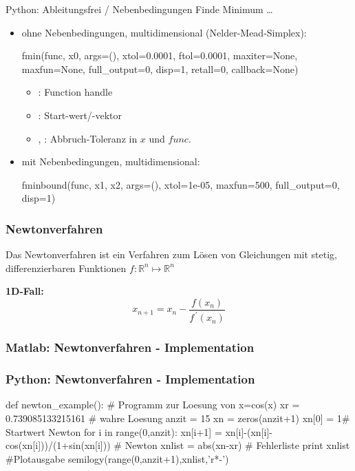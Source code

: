 \documentclass[hyperref={xetex}]{beamer}
\begin{document}
\begin{frame}[fragile]{Python: Ableitungsfrei / Nebenbedingungen}
Finde Minimum \ldots 

\begin{itemize}
  \item 
ohne Nebenbedingungen, multidimensional (Nelder-Mead-Simplex):
  \begin{pyin}
fmin(func, x0, args=(), xtol=0.0001, ftol=0.0001, maxiter=None, maxfun=None, full_output=0, disp=1, retall=0, callback=None)
  \end{pyin}
  \begin{itemize}
    \item {}: Function handle
    \item {}: Start-wert/-vektor
    \item {}, : Abbruch-Toleranz in $x$ und $func$.
  \end{itemize}
\item mit Nebenbedingungen, multidimensional:
  \begin{pyin}
fminbound(func, x1, x2, args=(), xtol=1e-05, maxfun=500, full_output=0, disp=1)    
  \end{pyin}
  \end{itemize}
\end{frame}

\begin{frame}[fragile]\frametitle{Newtonverfahren}

Das Newtonverfahren ist ein Verfahren zum Lösen von Gleichungen mit stetig, differenzierbaren 
Funktionen $f:\mathbb{R}^n \mapsto \mathbb{R}^n$

\textbf{1D-Fall:}
\[
 x_{n+1} = x_n - \frac{f(x_n)}{f^{\,\prime}(x_n)}
\]

\end{frame}

\begin{frame}[fragile]\frametitle{Matlab: Newtonverfahren - Implementation}
\end{frame}

\begin{frame}[fragile]\frametitle{Python: Newtonverfahren - Implementation}
\begin{pyin}
def newton_example():
    # Programm zur Loesung von x=cos(x)
    xr = 0.739085133215161 # wahre Loesung
    anzit = 15
    xn = zeros(anzit+1)
    xn[0] = 1# Startwert Newton
    for i in range(0,anzit):
        xn[i+1] = xn[i]-(xn[i]-cos(xn[i]))/(1+sin(xn[i])) # Newton
    xnlist = abs(xn-xr) # Fehlerliste 
    print xnlist
    #Plotausgabe
    semilogy(range(0,anzit+1),xnlist,'r*-')  
\end{pyin}
\end{frame}
\end{document}
